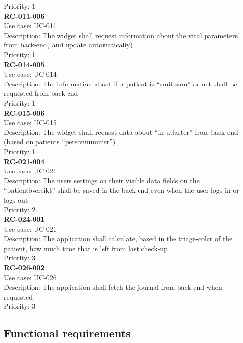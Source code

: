 Priority: 1 \\
\newline
\textbf{RC-011-006} \\
Use case: UC-011 \\
Description: The widget shall request information about the vital parameters from back-end( and update automatically)  \\
Priority: 1 \\
\newline
\textbf{RC-014-005} \\
Use case: UC-014 \\
Description: The information about if a patient is “smittsam” or not shall be requested from back-end \\
Priority: 1 \\
\newline
\textbf{RC-015-006} \\
Use case: UC-015 \\
Description: The widget shall request data about “in-utfarter” from back-end  (based on patients “personnummer”)  \\
Priority: 1 \\
\newline
\textbf{RC-021-004} \\
Use case: UC-021 \\
Description: The users settings on their visible data fields on the “patientöversikt” shall be saved in the back-end even when the user logs in or logs out \\
Priority: 2 \\
\newline
\textbf{RC-024-001} \\
Use case: UC-021 \\
Description: The application shall calculate, based in the triage-color of the patient, how much time that is left from last check-up  \\
Priority: 3 \\
\newline
\textbf{RC-026-002} \\
Use case: UC-026 \\
Description: The application shall fetch the journal from back-end when requested \\
Priority: 3 \\
\newline
\subsection{Functional requirements}


